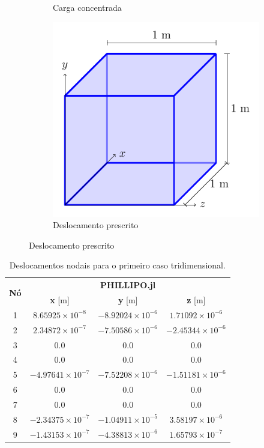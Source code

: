 \begin{figure}
\begin{subfigure}[b]{0.45\textwidth}
        \caption{Carga concentrada}
        \label{fig:verificacao_cubo_4}
    \end{subfigure}
    \begin{subfigure}[b]{0.45\textwidth}
        \centering
        \includegraphics[page=5]{Figuras/verificacao_cubo.pdf}
        \caption{Deslocamento prescrito}
        \label{fig:verificacao_cubo_5}
    \end{subfigure}
\end{figure}

\begin{table}
    \centering
    \caption{Deslocamentos nodais para o primeiro caso tridimensional.}
    \begin{tabular}{c | c c c }
        \toprule
        \multirow{2}{*}{\textbf{Nó}} & \multicolumn{3}{c}{\textbf{PHILLIPO.jl}}  \\
                                     & \textbf{x} [m] & \textbf{y} [m] & \textbf{z} [m]\\                            
        \midrule
        1 & $8.65925 \times 10^{-8}$ & $-8.92024 \times 10^{-6}$ & $1.71092 \times 10^{-6}$ \\
        2 & $2.34872 \times 10^{-7}$ & $-7.50586 \times 10^{-6}$ & $-2.45344 \times 10^{-6}$ \\
        3 & 0.0 & 0.0 & 0.0 \\
        4 & 0.0 & 0.0 & 0.0 \\
        5 & $-4.97641 \times 10^{-7}$ & $-7.52208 \times 10^{-6}$ & $-1.51181 \times 10^{-6}$ \\
        6 & 0.0 & 0.0 & 0.0 \\
        7 & 0.0 & 0.0 & 0.0 \\
        8 & $-2.34375\times 10^{-7}$ & $-1.04911 \times 10^{-5}$ & $3.58197 \times 10^{-6}$ \\
        9 & $-1.43153 \times 10^{-7}$ & $-4.38813 \times 10^{-6}$ & $1.65793 \times 10^{-7}$ \\
        \bottomrule
    \end{tabular}
    \label{tab:verificacao_cubo_1_deslocamentos}
\end{table}

